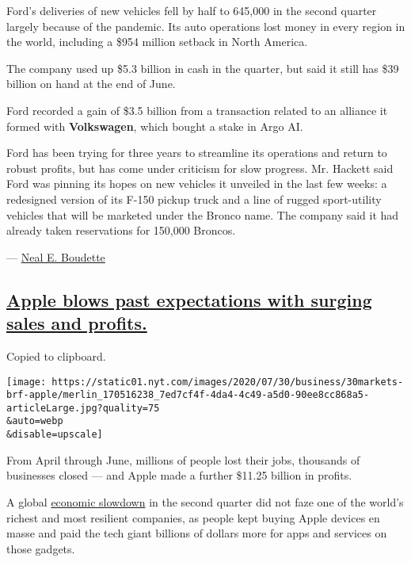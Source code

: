 Ford's deliveries of new vehicles fell by half to 645,000 in the second
quarter largely because of the pandemic. Its auto operations lost money
in every region in the world, including a \$954 million setback in North
America.

The company used up \$5.3 billion in cash in the quarter, but said it
still has \$39 billion on hand at the end of June.

Ford recorded a gain of \$3.5 billion from a transaction related to an
alliance it formed with \textbf{Volkswagen}, which bought a stake in
Argo AI.

Ford has been trying for three years to streamline its operations and
return to robust profits, but has come under criticism for slow
progress. Mr. Hackett said Ford was pinning its hopes on new vehicles it
unveiled in the last few weeks: a redesigned version of its F-150 pickup
truck and a line of rugged sport-utility vehicles that will be marketed
under the Bronco name. The company said it had already taken
reservations for 150,000 Broncos.

--- \href{https://www.nytimes.com/by/neal-e-boudette}{Neal E. Boudette}

\hypertarget{apple-blows-past-expectations-with-surging-sales-and-profits}{%
\subsection{\texorpdfstring{\protect\hyperlink{apple-blows-past-expectations-with-surging-sales-and-profits}{Apple
blows past expectations with surging sales and
profits.}}{Apple blows past expectations with surging sales and profits.}}\label{apple-blows-past-expectations-with-surging-sales-and-profits}}

Copied to clipboard.

\texttt{[image: https://static01.nyt.com/images/2020/07/30/business/30markets-brf-apple/merlin\_170516238\_7ed7cf4f-4da4-4c49-a5d0-90ee8cc868a5-articleLarge.jpg?quality=75\\\&auto=webp\\\&disable=upscale]}

From April through June, millions of people lost their jobs, thousands
of businesses closed --- and Apple made a further \$11.25 billion in
profits.

A global
\href{https://www.nytimes.com/live/2020/07/30/business/stock-market-today-coronavirus/the-us-economys-contraction-in-the-second-quarter-was-the-worst-on-record}{economic
slowdown} in the second quarter did not faze one of the world's richest
and most resilient companies, as people kept buying Apple devices en
masse and paid the tech giant billions of dollars more for apps and
services on those gadgets.

